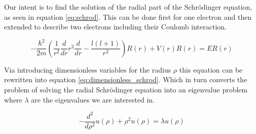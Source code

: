 Our intent is to find the solution of the radial part of the
Schrödinger equation, as seen in equation \ref{eq:schrod}.  This
can be done first for one electron and then extended to describe
two electrons including their Coulomb interaction.

\begin{equation}
    -\frac{\hbar^2}{2m}\left(
    \frac{1}{r^2}\frac{d}{dr}r^2\frac{d}{dr} -
    \frac{l(l+1)}{r^2} \right)R(r) + V(r)R(r) = ER(r)
    \label{eq:schrod}
\end{equation}

Via introducing dimensionless variables for the radius $\rho$ this
equation can be rewritten into equation
\ref{eq:dimensionless_schrod}. Which in turn converts the problem
of solving the radial Schrödinger equation into an eigenvalue
problem where $\lambda$ are the eigenvalues we are interested in.

\begin{equation}
    -\frac{d^2}{d\rho^2}u(\rho) + \rho^2u(\rho) = \lambda
    u(\rho)
    \label{eq:dimensionless_schrod}
\end{equation}
